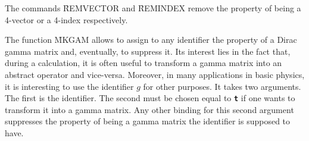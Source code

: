 \begin{itemize}
The commands \f{REMVECTOR} and \f{REMINDEX} remove the property of 
being a 4-vector or a 4-index respectively. 

The function \f{MKGAM} allows to assign to any identifier the property 
of a Dirac gamma matrix and, eventually, to suppress it. Its interest lies 
in the fact that, during a calculation, it is often useful to transform 
a gamma matrix into an abstract operator and vice-versa. Moreover, in many 
applications in basic physics, it is interesting to use the identifier $g$ 
for other purposes.  
It takes two arguments. The first is the identifier. The second must be 
chosen equal to {\tt\bf t} if one wants to transform it into a gamma matrix. Any
other binding for this second argument suppresses the property of being 
a gamma matrix the identifier is supposed to have. 
\end{itemize}
